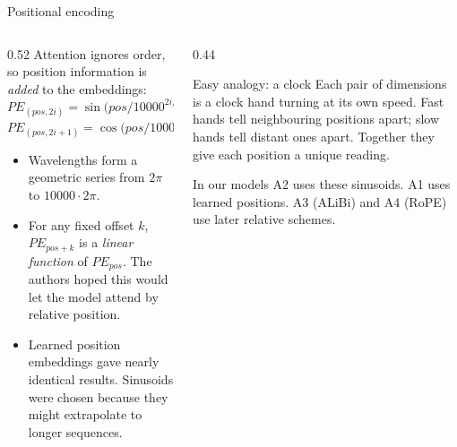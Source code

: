 \documentclass[aspectratio=169,11pt]{beamer}
\begin{document}
\begin{frame}{Positional encoding}
  \begin{columns}[T]
    \begin{column}{0.52\textwidth}
      \small
      Attention ignores order, so position information is \emph{added} to the embeddings:
      \[ PE_{(pos,2i)}=\sin\!\big(pos/10000^{2i/d}\big) \]
      \[ PE_{(pos,2i+1)}=\cos\!\big(pos/10000^{2i/d}\big) \]
      \begin{itemize}
        \item Wavelengths form a geometric series from $2\pi$ to $10000\cdot2\pi$.
        \item For any fixed offset $k$, $PE_{pos+k}$ is a \emph{linear function} of $PE_{pos}$. The authors hoped this would let the model attend by relative position.
        \item Learned position embeddings gave nearly identical results. Sinusoids were chosen because they might extrapolate to longer sequences.
      \end{itemize}
    \end{column}
    \begin{column}{0.44\textwidth}
      \begin{exampleblock}{Easy analogy: a clock}
        \small
        Each pair of dimensions is a clock hand turning at its own speed. Fast hands tell neighbouring positions apart; slow hands tell distant ones apart. Together they give each position a unique reading.
      \end{exampleblock}
      \begin{block}{In our models}
        \small
        A2 uses these sinusoids. A1 uses learned positions. A3 (ALiBi) and A4 (RoPE) use later relative schemes.
      \end{block}
    \end{column}
  \end{columns}
\end{frame}
\end{document}
